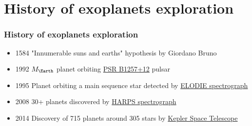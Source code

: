 \documentclass[aspectratio=169]{beamer}
\begin{document}
\section{History of exoplanets exploration}
\begin{frame}
\frametitle{History of exoplanets exploration}
\begin{itemize}
\item 1584 "Innumerable suns and earths" hypothesis by Giordano Bruno
\item 1992 $M_\Earth$ planet orbiting \href{https://en.wikipedia.org/wiki/PSR_B1257\%2B12}{PSR B1257+12} pulsar
\item 1995 Planet orbiting a main sequence star detected by
      \href{http://www.obs-hp.fr/guide/elodie/elodie-eng.html}{ELODIE spectrograph}
\item 2008 30+ planets discovered by \href{http://www.eso.org/sci/facilities/lasilla/instruments/harps.html}{HARPS spectrograph}
\item 2014 Discovery of 715 planets around 305 stars by %
      \href{http://www.nasa.gov/mission_pages/kepler/main/index.html}{Kepler Space Telescope}
\end{itemize}
\end{frame}
\end{document}
